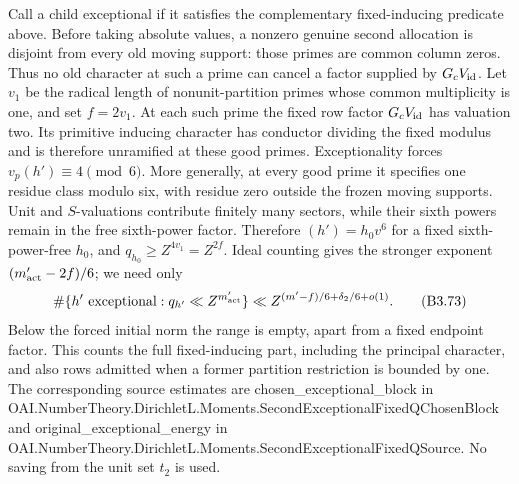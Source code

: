 \documentclass[11pt,a4paper]{article}
\newcommand{\sourcecode}[1]{{\small\ttfamily #1}}
\begin{document}
Call a child exceptional if it satisfies the complementary
fixed-inducing predicate above. Before taking absolute values, a nonzero
genuine second allocation is disjoint from every old moving support:
those primes are common column zeros. Thus no old character at such a
prime can cancel a factor supplied by \(G_cV_{\rm id}\). Let \(v_1\) be
the radical length of nonunit-partition primes whose common multiplicity
is one, and set \(f=2v_1\). At each such prime the fixed row factor
\(G_cV_{\rm id}\) has valuation two. Its primitive inducing character
has conductor dividing the fixed modulus and is therefore unramified at
these good primes. Exceptionality forces \(v_p(h')\equiv4\pmod6\). More
generally, at every good prime it specifies one residue class modulo
six, with residue zero outside the frozen moving supports. Unit and
\(S\)-valuations contribute finitely many sectors, while their sixth
powers remain in the free sixth-power factor. Therefore \((h')=h_0v^6\)
for a fixed sixth-power-free \(h_0\), and
\(q_{h_0}\ge Z^{4v_1}=Z^{2f}\). Ideal counting gives the stronger
exponent \((m'_{\rm act}-2f)/6\); we need only \[
\#\{h'\text{ exceptional}:q_{h'}\ll Z^{m'_{\rm act}}\}
\ll Z^{(m'-f)/6+\delta_2/6+o(1)}.
\tag{B3.73}
\] Below the forced initial norm the range is empty, apart from a fixed
endpoint factor. This counts the full fixed-inducing part, including the
principal character, and also rows admitted when a former partition
restriction is bounded by one. The corresponding source estimates are
\sourcecode{chosen\_\allowbreak{}exceptional\_\allowbreak{}block} in
\sourcecode{OAI.\allowbreak{}Number\allowbreak{}Theory.\allowbreak{}Dirichlet\allowbreak{}L.\allowbreak{}Moments.\allowbreak{}Second\allowbreak{}Exceptional\allowbreak{}Fixed\allowbreak{}QChosen\allowbreak{}Block}
and \sourcecode{original\_\allowbreak{}exceptional\_\allowbreak{}energy} in
\sourcecode{OAI.\allowbreak{}Number\allowbreak{}Theory.\allowbreak{}Dirichlet\allowbreak{}L.\allowbreak{}Moments.\allowbreak{}Second\allowbreak{}Exceptional\allowbreak{}Fixed\allowbreak{}QSource}.
No saving from the unit set \(t_2\) is used.
\end{document}

